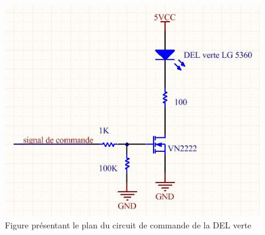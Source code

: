 \begin{figure}[htbp]
\centering
\includegraphics[scale=0.5]{fig/del_verte.jpg}
\caption{Figure présentant le plan du circuit de commande de la DEL verte}
\label{fig:del_verte}
\end{figure}
